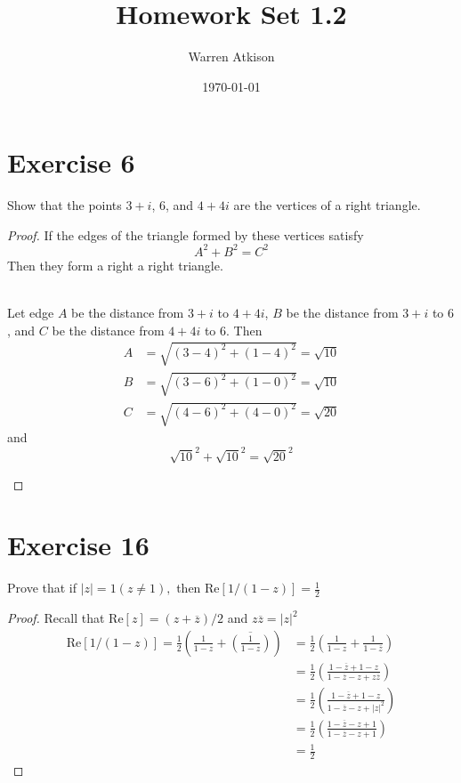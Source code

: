 \documentclass{article}
\title{Homework Set 1.2}
\author{Warren Atkison}
\date{\today}
\begin{document}
\maketitle

\section*{Exercise 6}
Show that the points $3 + i$, 6, and $4 + 4i$ are the vertices of a right triangle.
\begin{proof}
	If the edges of the triangle formed by these vertices satisfy
	\[
		A^2 + B^2 = C^2
	\]
	Then they form a right a right triangle.
	\begin{multicols}{2}
		
	 \\
	Let edge $A$ be the distance from $3 + i$ to $4 + 4i$, $B$ be the distance from $3 + i$ to $6$, and $C$ be the distance from $4 + 4i$ to $6$. Then
	\begin{align*}
		A &= \sqrt{(3 - 4)^2 + (1 - 4)^2} = \sqrt{10} \\
		B &= \sqrt{(3 - 6)^2 + (1 - 0)^2} = \sqrt{10} \\
		C &= \sqrt{(4 - 6)^2 + (4 - 0)^2} = \sqrt{20}     
	\end{align*}
	and
	\[
		\sqrt{10}^2 + \sqrt{10}^2 = \sqrt{20}^2   
	\]
	\end{multicols}
\end{proof}
\section*{Exercise 16}
Prove that if $|z| = 1 (z \neq 1),$ then Re$[1/(1 - z)] = \frac{1}{2}$
\begin{proof}
	Recall that Re$[z] = (z + \overline{z})/2$ and $z\overline{z} = |z|^2$
	\begin{align*}
		\text{Re}[1/(1-z)] = \frac{1}{2}\left(\frac{1}{1-z} + \overline{\left(\frac{1}{1 - z}\right)}\right) &= \frac{1}{2}\left(\frac{1}{1 - z} + \frac{1}{1 - \overline{z}}\right) \\
														     &= \frac{1}{2}\left(\frac{1 - \overline{z} + 1 - z}{1 - \overline{z} - z + z\overline{z}}\right) \\
														     &= \frac{1}{2}\left(\frac{1 - \overline{z} + 1 - z}{1 - \overline{z} - z + |z|^2}\right) \\
														     &= \frac{1}{2}\left(\frac{1 - \overline{z} - z + 1}{1 - \overline{z} - z + 1}\right)\\  &= \frac{1}{2}
	\end{align*}
\end{proof}
\newpage
\end{document}
